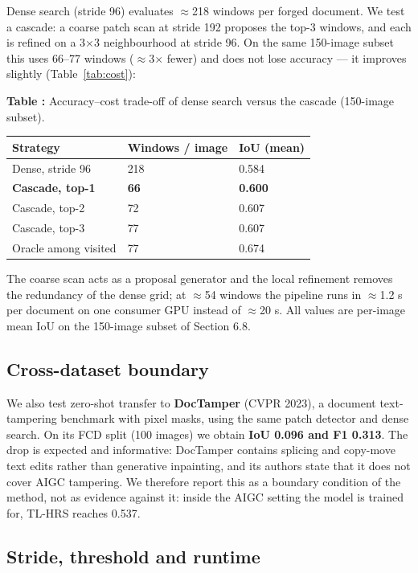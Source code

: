 \documentclass[preprint,12pt]{elsarticle}
\newcounter{tabno}
\newcommand{\tabcaption}[1]{\par\needspace{9\baselineskip}\refstepcounter{tabno}\noindent\textbf{Table \thetabno:} #1\par\vspace{2pt}}
\begin{document}
Dense search (stride 96) evaluates $\approx$218 windows per forged document. We test a cascade: a coarse patch scan at stride 192 proposes the top-3 windows, and each is refined on a 3×3 neighbourhood at stride 96. On the same 150-image subset this uses 66--77 windows ($\approx$3$\times$ fewer) and does not lose accuracy --- it improves slightly (Table~\ref{tab:cost}):

{
\tabcaption{Accuracy--cost trade-off of dense search versus the cascade (150-image subset).}\label{tab:cost}
\begin{longtable}[]{@{}lll@{}}
\toprule\noalign{}
Strategy & Windows / image & IoU (mean) \\
\midrule\noalign{}
\endhead
\bottomrule\noalign{}
\endlastfoot
Dense, stride 96 & 218 & 0.584 \\
\textbf{Cascade, top-1} & \textbf{66} & \textbf{0.600} \\
Cascade, top-2 & 72 & 0.607 \\
Cascade, top-3 & 77 & 0.607 \\
Oracle among visited & 77 & 0.674 \\
\end{longtable}
}

The coarse scan acts as a proposal generator and the local refinement removes the redundancy of the dense grid; at $\approx$54 windows the pipeline runs in $\approx$1.2 s per document on one consumer GPU instead of $\approx$20 s. All values are per-image mean IoU on the 150-image subset of Section 6.8.

\subsection{Cross-dataset boundary}\label{cross-dataset-boundary}

We also test zero-shot transfer to \textbf{DocTamper} (CVPR 2023), a document text-tampering benchmark with pixel masks, using the same patch detector and dense search. On its FCD split (100 images) we obtain \textbf{IoU 0.096 and F1 0.313}. The drop is expected and informative: DocTamper contains splicing and copy-move text edits rather than generative inpainting, and its authors state that it does not cover AIGC tampering. We therefore report this as a boundary condition of the method, not as evidence against it: inside the AIGC setting the model is trained for, TL-HRS reaches 0.537.

\subsection{Stride, threshold and runtime}\label{stride-threshold-and-runtime}
\end{document}
